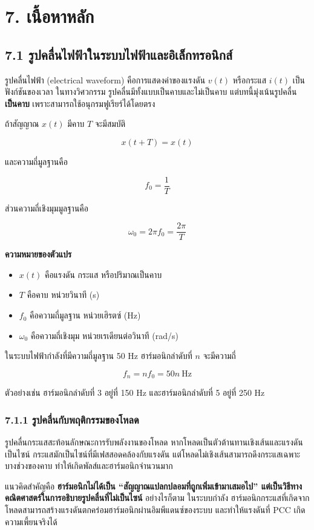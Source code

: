 \section{7. เนื้อหาหลัก}

\subsection{7.1 รูปคลื่นไฟฟ้าในระบบไฟฟ้าและอิเล็กทรอนิกส์}

รูปคลื่นไฟฟ้า (electrical waveform) คือการแสดงค่าของแรงดัน $v(t)$ หรือกระแส $i(t)$ เป็นฟังก์ชันของเวลา ในทางวิศวกรรม รูปคลื่นมีทั้งแบบเป็นคาบและไม่เป็นคาบ แต่บทนี้มุ่งเน้นรูปคลื่น \textbf{เป็นคาบ} เพราะสามารถใช้อนุกรมฟูเรียร์ได้โดยตรง

ถ้าสัญญาณ $x(t)$ มีคาบ $T$ จะมีสมบัติ

\[
x(t+T)=x(t)
\]

และความถี่มูลฐานคือ

\[
f_0=\frac{1}{T}
\]

ส่วนความถี่เชิงมุมมูลฐานคือ

\[
\omega_0=2\pi f_0=\frac{2\pi}{T}
\]

\textbf{ความหมายของตัวแปร}

\begin{itemize}
    \item $x(t)$ คือแรงดัน กระแส หรือปริมาณเป็นคาบ
    \item $T$ คือคาบ หน่วยวินาที (s)
    \item $f_0$ คือความถี่มูลฐาน หน่วยเฮิรตซ์ (Hz)
    \item $\omega_0$ คือความถี่เชิงมุม หน่วยเรเดียนต่อวินาที (rad/s)
\end{itemize}

ในระบบไฟฟ้ากำลังที่มีความถี่มูลฐาน 50 Hz ฮาร์มอนิกลำดับที่ $n$ จะมีความถี่

\[
f_n=nf_0=50n\ \text{Hz}
\]

ตัวอย่างเช่น ฮาร์มอนิกลำดับที่ 3 อยู่ที่ 150 Hz และฮาร์มอนิกลำดับที่ 5 อยู่ที่ 250 Hz

\subsubsection{7.1.1 รูปคลื่นกับพฤติกรรมของโหลด}

รูปคลื่นกระแสสะท้อนลักษณะการรับพลังงานของโหลด หากโหลดเป็นตัวต้านทานเชิงเส้นและแรงดันเป็นไซน์ กระแสมักเป็นไซน์ที่มีเฟสสอดคล้องกับแรงดัน แต่โหลดไม่เชิงเส้นสามารถดึงกระแสเฉพาะบางช่วงของคาบ ทำให้เกิดพัลส์และฮาร์มอนิกจำนวนมาก

แนวคิดสำคัญคือ \textbf{ฮาร์มอนิกไม่ได้เป็น “สัญญาณแปลกปลอมที่ถูกเพิ่มเข้ามาเสมอไป” แต่เป็นวิธีทางคณิตศาสตร์ในการอธิบายรูปคลื่นที่ไม่เป็นไซน์} อย่างไรก็ตาม ในระบบกำลัง ฮาร์มอนิกกระแสที่เกิดจากโหลดสามารถสร้างแรงดันตกคร่อมฮาร์มอนิกผ่านอิมพีแดนซ์ของระบบ และทำให้แรงดันที่ PCC เกิดความเพี้ยนจริงได้

